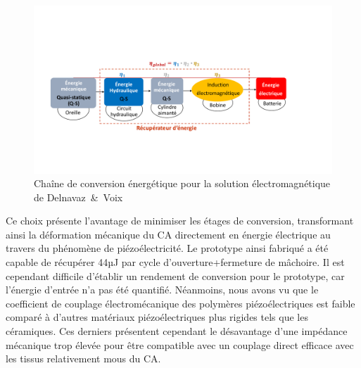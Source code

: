 \begin{figure}[!htbp]
\begin{center}
    \captionsetup{justification=centering}
	\includegraphics[trim={1cm 4.5cm 1cm 6cm},clip, width=\textwidth]{../Chap2/Figure/conversion_critias_electromag.pdf}
	\caption{Chaîne de conversion énergétique pour la solution électromagnétique de \mbox{Delnavaz \& Voix \cite{Delnavaz2014}}}
	\label{fig:conversion_critias_electromag}
\end{center}
\end{figure}

Ce choix présente l'avantage de minimiser les étages de conversion, transformant ainsi la déformation mécanique du CA directement en énergie électrique au travers du phénomène de piézoélectricité. Le prototype ainsi fabriqué a été capable de récupérer 44µJ par cycle d'ouverture+fermeture de mâchoire. Il est cependant difficile d'établir un rendement de conversion pour le prototype, car l'énergie d'entrée n'a pas été quantifié. Néanmoins, nous avons vu que le coefficient de couplage électromécanique des polymères piézoélectriques est faible comparé à d'autres matériaux piézoélectriques plus rigides tels que les céramiques. Ces derniers présentent cependant le désavantage d'une impédance mécanique trop élevée pour être compatible avec un couplage direct efficace avec les tissus relativement mous du CA.

